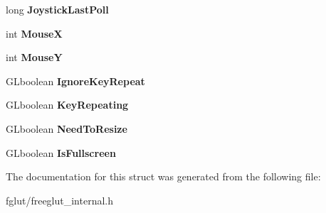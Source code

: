 \begin{DoxyCompactItemize}
\item 
long {\bfseries Joystick\+Last\+Poll}\hypertarget{structtag_s_f_g___window_state_ac8452664a5c4f8000e874e9396e9c5f8}{}\label{structtag_s_f_g___window_state_ac8452664a5c4f8000e874e9396e9c5f8}

\item 
int {\bfseries MouseX}\hypertarget{structtag_s_f_g___window_state_ac8a6cc2538f770200f89676bb7ce354f}{}\label{structtag_s_f_g___window_state_ac8a6cc2538f770200f89676bb7ce354f}

\item 
int {\bfseries MouseY}\hypertarget{structtag_s_f_g___window_state_a27b44bc192bb3baecfbb1b29b57617f7}{}\label{structtag_s_f_g___window_state_a27b44bc192bb3baecfbb1b29b57617f7}

\item 
G\+Lboolean {\bfseries Ignore\+Key\+Repeat}\hypertarget{structtag_s_f_g___window_state_a0b01d7a5017a25538d4a9b136e74166b}{}\label{structtag_s_f_g___window_state_a0b01d7a5017a25538d4a9b136e74166b}

\item 
G\+Lboolean {\bfseries Key\+Repeating}\hypertarget{structtag_s_f_g___window_state_a398b741a72eb5e61756feb09da77ac1f}{}\label{structtag_s_f_g___window_state_a398b741a72eb5e61756feb09da77ac1f}

\item 
G\+Lboolean {\bfseries Need\+To\+Resize}\hypertarget{structtag_s_f_g___window_state_a4a2338c7311395f4833300006f973f5b}{}\label{structtag_s_f_g___window_state_a4a2338c7311395f4833300006f973f5b}

\item 
G\+Lboolean {\bfseries Is\+Fullscreen}\hypertarget{structtag_s_f_g___window_state_a494dee3b7019bf61d5c3f477fddeb37d}{}\label{structtag_s_f_g___window_state_a494dee3b7019bf61d5c3f477fddeb37d}

\end{DoxyCompactItemize}


The documentation for this struct was generated from the following file\+:\begin{DoxyCompactItemize}
\item 
fglut/freeglut\+\_\+internal.\+h\end{DoxyCompactItemize}
